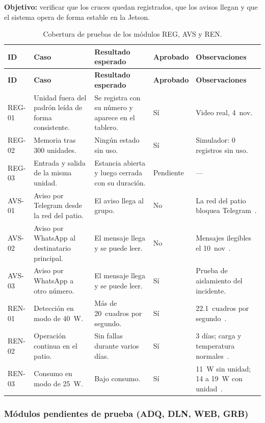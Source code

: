\textbf{Objetivo:} verificar que los cruces quedan registrados, que los
avisos llegan y que el sistema opera de forma estable en la Jetson.

{\small
\begin{longtable}{@{}L{1.3cm}L{4.3cm}L{3.8cm}C{1.4cm}L{3.2cm}@{}}
  \caption{Cobertura de pruebas de los módulos REG, AVS y REN.}
  \label{tab:reg-avs-ren} \\
  \toprule
  \textbf{ID} & \textbf{Caso} & \textbf{Resultado esperado} &
    \textbf{Aprobado} & \textbf{Observaciones} \\
  \midrule
  \endfirsthead
  \toprule
  \textbf{ID} & \textbf{Caso} & \textbf{Resultado esperado} &
    \textbf{Aprobado} & \textbf{Observaciones} \\
  \midrule
  \endhead
  REG-01 & Unidad fuera del padrón leída de forma consistente. & Se
    registra con su número y aparece en el tablero. & Sí & Video real,
    4~nov. \\
  REG-02 & Memoria tras 300 unidades. & Ningún estado sin uso. & Sí &
    Simulador: 0 registros sin uso. \\
  REG-03 & Entrada y salida de la misma unidad. & Estancia abierta y luego
    cerrada con su duración. & Pendiente & --- \\
  AVS-01 & Aviso por Telegram desde la red del patio. & El aviso llega al
    grupo. & No & La red del patio bloquea Telegram~\cite{rep-envivo}. \\
  AVS-02 & Aviso por WhatsApp al destinatario principal. & El mensaje
    llega y se puede leer. & No & Mensajes ilegibles el
    10~nov~\cite{rep-whatsapp}. \\
  AVS-03 & Aviso por WhatsApp a otro número. & El mensaje llega y se puede
    leer. & Sí & Prueba de aislamiento del incidente. \\
  REN-01 & Detección en modo de 40~W. & Más de 20~cuadros por segundo. &
    Sí & 22.1~cuadros por segundo~\cite{rep-fusion}. \\
  REN-02 & Operación continua en el patio. & Sin fallas durante varios
    días. & Sí & 3 días; carga y temperatura normales~\cite{rep-envivo}. \\
  REN-03 & Consumo en modo de 25~W. & Bajo consumo. & Sí & 11~W sin unidad;
    14 a 19~W con unidad~\cite{rep-tecnico}. \\
  \bottomrule
\end{longtable}
}

\subsubsection{Módulos pendientes de prueba (ADQ, DLN, WEB, GRB)}

